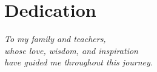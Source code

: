 \chapter*{Dedication}

\thispagestyle{plain}
\vspace*{3cm} %

\begin{center}
    \textit{
    To my family and teachers,\\[0.3cm]
    whose love, wisdom, and inspiration\\[0.3cm]
    have guided me throughout this journey.
    }
\end{center}
